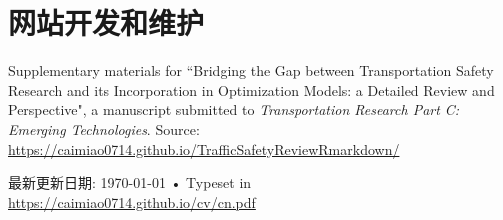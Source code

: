 \documentclass[11pt, a4paper]{article}
\newcommand{\years}[1]{\marginnote{\scriptsize #1}}
\begin{document}
\section*{网站开发和维护}
\years{2019}Supplementary materials for ``Bridging the Gap between Transportation Safety Research and its Incorporation in Optimization Models: a Detailed Review and Perspective", a manuscript submitted to \emph{Transportation Research Part C: Emerging Technologies}. Source: \href{https://caimiao0714.github.io/TrafficSafetyReviewRmarkdown/}{https://caimiao0714.github.io/TrafficSafetyReviewRmarkdown/}


\vfill{}

\begin{center}
{\scriptsize  最新更新日期: \today\- •\- 
Typeset in \href{https://caimiao0714.github.io/cv/cn.pdf}{
\XeTeX }\\
\href{https://caimiao0714.github.io/cv/cn.pdf}{https://caimiao0714.github.io/cv/cn.pdf}}
\end{center}
\end{document}
